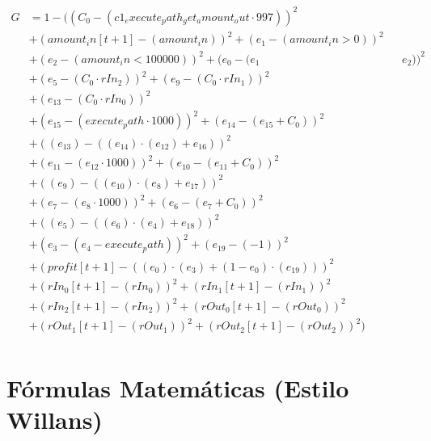 \documentclass[10pt, a4paper]{article}
\begin{document}
\begin{small}
\begin{align*}
G &= 1 - ((C_{0} - (c1_execute_path_get_amount_out  \cdot  997))^{2} \\
& + (amount_in[t+1] - (amount_in))^{2} + (e_{1} - (amount_in > 0))^{2} \\
& + (e_{2} - (amount_in < 100000))^{2} + (e_{0} - (e_{1} && e_{2}))^{2} \\
& + (e_{5} - (C_{0}  \cdot  rIn_2))^{2} + (e_{9} - (C_{0}  \cdot  rIn_1))^{2} \\
& + (e_{13} - (C_{0}  \cdot  rIn_0))^{2} \\
& + (e_{15} - (execute_path  \cdot  1000))^{2} + (e_{14} - (e_{15} + C_{0}))^{2} \\
& + ((e_{13}) - ((e_{14})  \cdot  (e_{12}) + e_{16}))^{2} \\
& + (e_{11} - (e_{12}  \cdot  1000))^{2} + (e_{10} - (e_{11} + C_{0}))^{2} \\
& + ((e_{9}) - ((e_{10})  \cdot  (e_{8}) + e_{17}))^{2} \\
& + (e_{7} - (e_{8}  \cdot  1000))^{2} + (e_{6} - (e_{7} + C_{0}))^{2} \\
& + ((e_{5}) - ((e_{6})  \cdot  (e_{4}) + e_{18}))^{2} \\
& + (e_{3} - (e_{4} - execute_path))^{2} + (e_{19} - (-1))^{2} \\
& + (profit[t+1] - ((e_{0})  \cdot  (e_{3}) + (1 - e_{0})  \cdot  (e_{19})))^{2} \\
& + (rIn_0[t+1] - (rIn_0))^{2} + (rIn_1[t+1] - (rIn_1))^{2} \\
& + (rIn_2[t+1] - (rIn_2))^{2} + (rOut_0[t+1] - (rOut_0))^{2} \\
& + (rOut_1[t+1] - (rOut_1))^{2} + (rOut_2[t+1] - (rOut_2))^{2}) \\
\end{align*}
\end{small}\part{Fórmulas Matemáticas (Estilo Willans)}
\end{document}
